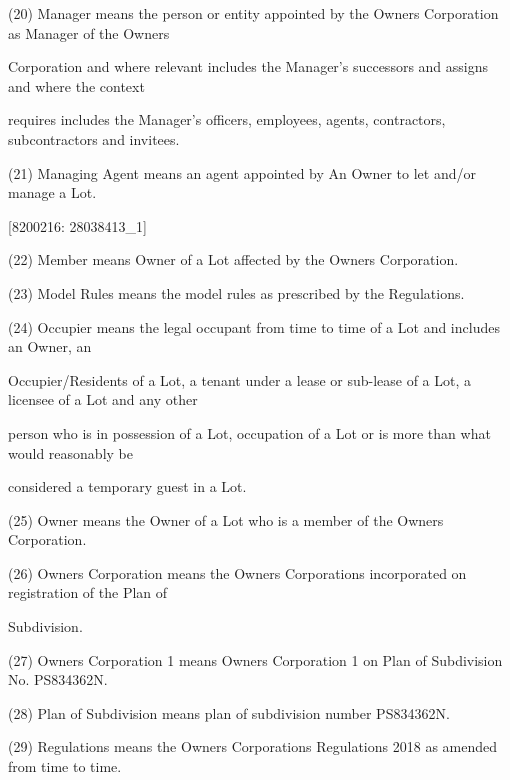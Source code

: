 \documentclass{article}
\begin{document}
{\fontsize{9.962}{1}(20) Manager means the person or entity appointed by the Owners Corporation as Manager of the Owners }

{\fontsize{10.02}{1}Corporation and where relevant includes the Manager’s successors and assigns and where the context }

{\fontsize{10.02}{1}requires includes the Manager’s officers, employees, agents, contractors, subcontractors and invitees. }

{\fontsize{9.962}{1}(21) Managing Agent means an agent appointed by An Owner to let and/or manage a Lot. }

\newpage
















{\fontsize{7.02}{1}[8200216: 28038413\_1] }

{\fontsize{9.962}{1}(22) Member means Owner of a Lot affected by the Owners Corporation. }

{\fontsize{9.962}{1}(23) Model Rules means the model rules as prescribed by the Regulations. }

{\fontsize{9.962}{1}(24) Occupier means the legal occupant from time to time of a Lot and includes an Owner, an }

{\fontsize{10.02}{1}Occupier/Residents of a Lot, a tenant under a lease or sub-lease of a Lot, a licensee of a Lot and any other }

{\fontsize{10.02}{1}person who is in possession of a Lot, occupation of a Lot or is more than what would reasonably be }

{\fontsize{10.02}{1}considered a temporary guest in a Lot. }

{\fontsize{9.962}{1}(25) Owner means the Owner of a Lot who is a member of the Owners Corporation. }

{\fontsize{9.962}{1}(26) Owners Corporation means the Owners Corporations incorporated on registration of the Plan of }

{\fontsize{10.02}{1}Subdivision. }

{\fontsize{9.962}{1}(27) Owners Corporation 1 means Owners Corporation 1 on Plan of Subdivision No. PS834362N. }

{\fontsize{9.962}{1}(28) Plan of Subdivision means plan of subdivision number PS834362N. }

{\fontsize{9.962}{1}(29) Regulations means the Owners Corporations Regulations 2018 as amended from time to time. }
\end{document}

